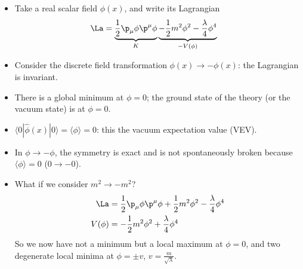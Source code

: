 \documentclass[a4paper, 11pt, normalem]{report}
\begin{document}
\begin{itemize}
    \item Take a real scalar field $\phi(x)$, and write its Lagrangian
        \begin{align}
            \La &= \underbrace{\frac12\p_\mu\phi\p^\mu\phi}_{K} \underbrace{- \frac12 m^2\phi^2 - \frac{\lambda}{4}\phi^4}_{-V(\phi)}
        \end{align}
    \item Consider the discrete field transformation $\phi(x)\to-\phi(x)$: the Lagrangian is invariant.
        \begin{figure}[H]
            \centering
        \end{figure}
    \item There is a global minimum at $\phi=0$; the ground state of the theory (or the vacuum state) is at $\phi=0$.
    \item $\langle0|\hat{\phi}(x)|0\rangle = \langle\phi\rangle = 0$: this the vacuum expectation value (VEV).
    \item In $\phi\to-\phi$, the symmetry is exact and is not spontaneously broken because $\langle\phi\rangle=0$ ($0\to-0$).
    \item What if we consider $m^2\to-m^2$?
        \begin{align}
            \La &= \frac12\p_\mu\phi\p^\mu\phi + \frac12m^2\phi^2 - \frac{\lambda}{4}\phi^4 \\
            V(\phi) &= -\frac12m^2\phi^2 + \frac{\lambda}{4}\phi^4
        \end{align}
        So we now have not a minimum but a local maximum at $\phi=0$, and two degenerate local minima at $\phi=\pm v$, $v=\frac{m}{\sqrt{\lambda}}$.
        \begin{figure}[H]
            \centering
\end{figure}
\end{itemize}
\end{document}
